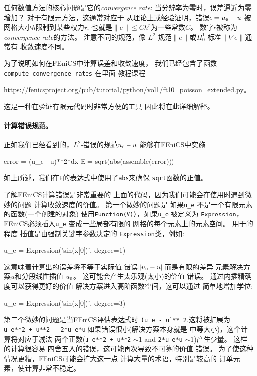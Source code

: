
任何数值方法的核心问题是它的\emph{convergence rate}:
当分辨率为零时，误差逼近为零
增加？ 对于有限元方法，这通常对应于
从理论上或经验证明，错误$e = u_{\mbox{\footnotesize e}} - u$
被网格大小$h$限制到某些权力$r$; 也就是$\|e\|
\leq C h^r$为一些常数$C$。 数字$r$被称为
\emph{convergence rate}的方法。 注意不同的规范，像
$L^2$-规范$\|e\|$或$H^1_0$-标准$\|\nabla e\|$通常有
收敛速度不同。

为了说明如何在FEniCS中计算误差和收敛速度，
我们已经包含了函数\verb!compute_convergence_rates! 在里面
教程课程
\begin{center}
\url{https://fenicsproject.org/pub/tutorial/python/vol1/ft10_poisson_extended.py}。
\end{center}
这是一种在验证有限元代码时非常方便的工具
因此将在此详细解释。

\paragraph{计算错误规范。}

正如我们已经看到的，$L^2$-错误的规范$u_{\mbox{\footnotesize e}} - u$
能够在FEniCS中实施

\begin{python}
error = (u_e - u)**2*dx
E = sqrt(abs(assemble(error)))
\end{python}
如上所述，我们在\texttt{E}的表达式中使用了\texttt{abs}来确保
\texttt{sqrt}函数的正值。

了解FEniCS计算错误是非常重要的
上面的代码，因为我们可能会在使用时遇到微妙的问题
计算收敛速度的价值。 第一个微妙的问题是
如果\verb!u_e! 不是一个有限元素的函数(一个创建的对象)
使用\texttt{Function(V)}），如果\verb!u_e! 被定义为
\texttt{Expression}，FEniCS必须插入\verb!u_e! 变成一些局部有限的
网格的每个元素上的元素空间。 用于的程度
插值是由强制关键字参数决定的
\texttt{Expression}类，例如:

\begin{python}
u_e = Expression('sin(x[0])', degree=1)
\end{python}
这意味着计算出的误差将不等于实际值
错误$\|u_{\mbox{\footnotesize e}} - u\|$而是有限的差异
元素解决方案$u$和分段线性插值
$u_{\mbox{\footnotesize e}}$。 这可能会产生太乐观(太小)的价值
错误。 通过内插精确度可以获得更好的价值
解决方案进入高阶函数空间，这可以通过
简单地增加学位:

\begin{python}
u_e = Expression('sin(x[0])', degree=3)
\end{python}

第二个微妙的问题是当FEniCS评估表达式时
\verb!(u_e - u)** 2!,这将被扩展为\\\verb!u_e**2 + u**2 - 2*u_e*u! 如果错误很小(解决方案本身就是
中等大小)，这个计算将对应于减法
两个正数(\verb!u_e**2 + u**2! $\sim 1$ and \verb!2*u_e*u! $\sim
1$)产生少量。 这样的计算很容易
四舍五入的错误，这可能再次导致不可靠的价值
错误。 为了使这种情况更糟，FEniCS可能会扩大这一点
计算大量的术语，特别是较高的
订单元素，使计算非常不稳定。

